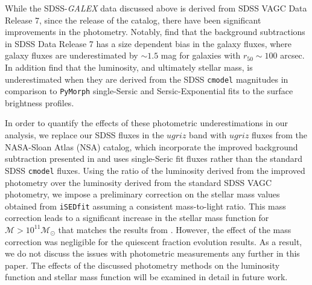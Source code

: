 \documentclass{emulateapj}
\begin{document}
While the SDSS-{\em GALEX} data discussed above is derived from SDSS VAGC Data Release 7, since the release of the catalog, there have been significant improvements in the photometry. Notably, \cite{Blanton:2011aa} find that the background subtractions in SDSS Data Release 7 has a size dependent bias in the galaxy fluxes, where galaxy fluxes are underestimated by $\sim 1.5$ mag for galaxies with $r_{50} \sim 100 $ arcsec. In addition \cite{Bernardi:2013aa} find that the luminosity, and ultimately stellar mass, is underestimated when they are derived from the SDSS \texttt{cmodel} magnitudes in comparison to \texttt{PyMorph} single-Sersic and Sersic-Exponential fits to the surface brightness profiles. 

In order to quantify the effects of these photometric underestimations in our analysis, we replace our SDSS fluxes in the $ugriz$ band with $ugriz$ fluxes from the NASA-Sloan Atlas (NSA) catalog, which incorporate the improved background subtraction presented in \cite{Blanton:2011aa} and uses single-Seric fit fluxes rather than the standard SDSS \texttt{cmodel} fluxes. Using the ratio of the luminosity derived from the improved photometry over the luminosity derived from the standard SDSS VAGC photometry, we impose a preliminary correction on the stellar mass values obtained from \texttt{iSEDfit} assuming a consistent mass-to-light ratio. This mass correction leads to a significant increase in the stellar mass function for $\mathcal{M} > 10^{11} \mathcal{M}_{\odot}$ that matches the results from \cite{Bernardi:2013aa}. However, the effect of the mass correction was negligible for the quiescent fraction evolution results. As a result, we do not discuss the issues with photometric measurements any further in this paper. The effects of the discussed photometry methods on the luminosity function and stellar mass function will be examined in detail in future work. 
\end{document}
